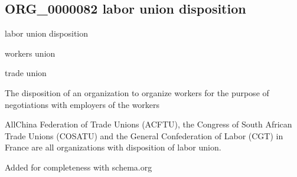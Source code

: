 \documentclass[letterpaper,10pt,english]{sphinxmanual}
\begin{document}
\subsection{ORG\_0000082 \sphinxhyphen{} labor union disposition}
\label{\detokenize{doc-ORG_0000082:org-0000082-labor-union-disposition}}\label{\detokenize{doc-ORG_0000082:index-0}}\label{\detokenize{doc-ORG_0000082::doc}}
\begin{sphinxShadowBox}

\sphinxAtStartPar
labor union disposition
\end{sphinxShadowBox}

\begin{sphinxShadowBox}

\sphinxAtStartPar
workers union

\sphinxAtStartPar
trade union
\end{sphinxShadowBox}

\begin{sphinxShadowBox}

\sphinxAtStartPar
{\hyperref[\detokenize{doc-BFO_0000016::doc}]{}}
\end{sphinxShadowBox}

\begin{sphinxShadowBox}

\sphinxAtStartPar
The disposition of an organization to organize workers for the purpose of negotiations with employers of the workers
\end{sphinxShadowBox}

\begin{sphinxShadowBox}

\sphinxAtStartPar
{}
\end{sphinxShadowBox}

\begin{sphinxShadowBox}

\sphinxAtStartPar
All\sphinxhyphen{}China Federation of Trade Unions (ACFTU), the Congress of South African Trade Unions (COSATU) and the General Confederation of Labor (CGT) in France are all organizations with disposition of labor union.
\end{sphinxShadowBox}

\begin{sphinxShadowBox}

\sphinxAtStartPar
Added for completeness with schema.org
\end{sphinxShadowBox}
\end{document}
